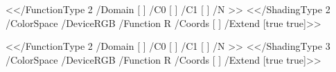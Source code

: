   {%
   \immediate\pdfobj 
     {<</FunctionType 2
        /Domain [ ]          
        /C0 [  ]       
        /C1 [  ] 
        /N >>}%
   \immediate\pdfobj 
     {<</ShadingType 2
        /ColorSpace /DeviceRGB
        /Function \the\pdflastobj{} R
        /Coords [   ]  
        /Extend [true true]>>}%
   \stopMPshading}

  {%
   \immediate\pdfobj 
     {<</FunctionType 2
        /Domain [ ]          
        /C0 [  ] 
        /C1 [  ] 
        /N >>}%
   \immediate\pdfobj 
     {<</ShadingType 3
        /ColorSpace /DeviceRGB
        /Function \the\pdflastobj{} R
        /Coords [     ]  
        /Extend [true true]>>}%
   \stopMPshading}

\protect \endinput 
